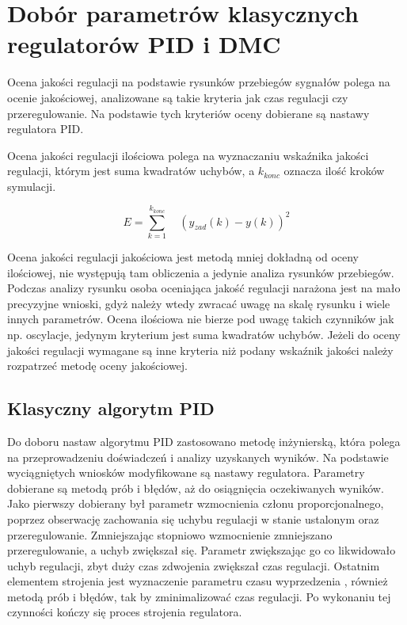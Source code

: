 \section{Dobór parametrów klasycznych regulatorów PID i DMC}
\label{projekt:zad4}

Ocena jakości regulacji na podstawie rysunków przebiegów sygnałów polega na ocenie jakościowej, 
analizowane są takie kryteria jak czas regulacji czy przeregulowanie. 
Na podstawie tych kryteriów oceny dobierane są nastawy regulatora PID.

Ocena jakości regulacji ilościowa polega na wyznaczaniu wskaźnika jakości regulacji, 
którym jest suma kwadratów uchybów, a $k_{konc}$ oznacza ilość kroków symulacji. 



$$
E=\sum_{k=1}^{k_{konc}} \quad (y_{zad}(k)-y(k))^{2}
$$

Ocena jakości regulacji jakościowa jest metodą mniej dokładną od oceny ilościowej, 
nie występują tam obliczenia a jedynie analiza rysunków przebiegów. 
Podczas analizy rysunku osoba oceniająca jakość regulacji narażona jest na mało precyzyjne wnioski, 
gdyż należy wtedy zwracać uwagę na skalę rysunku i wiele innych parametrów. 
Ocena ilościowa nie bierze pod uwagę takich czynników jak np. oscylacje, 
jedynym kryterium jest suma kwadratów uchybów. 
Jeżeli do oceny jakości regulacji wymagane są inne kryteria niż podany wskaźnik jakości 
należy rozpatrzeć metodę oceny jakościowej.

\subsection{Klasyczny algorytm PID}
\label{projekt:zad4:PID}

Do doboru nastaw algorytmu PID zastosowano metodę inżynierską, 
która polega na przeprowadzeniu doświadczeń i analizy uzyskanych wyników. 
Na podstawie wyciągniętych wniosków modyfikowane są nastawy regulatora. 
Parametry  dobierane są metodą prób i błędów, aż do osiągnięcia oczekiwanych wyników. 
Jako pierwszy dobierany był parametr wzmocnienia członu proporcjonalnego, 
poprzez obserwację zachowania się uchybu regulacji w stanie ustalonym oraz przeregulowanie. 
Zmniejszając stopniowo wzmocnienie zmniejszano przeregulowanie, a uchyb zwiększał się. 
Parametr  zwiększając go co likwidowało uchyb regulacji,  
zbyt duży czas zdwojenia zwiększał czas regulacji. 
Ostatnim elementem strojenia jest wyznaczenie parametru czasu wyprzedzenia , 
również metodą prób i błędów, tak by zminimalizować czas regulacji. 
Po wykonaniu tej czynności kończy się proces strojenia regulatora.

